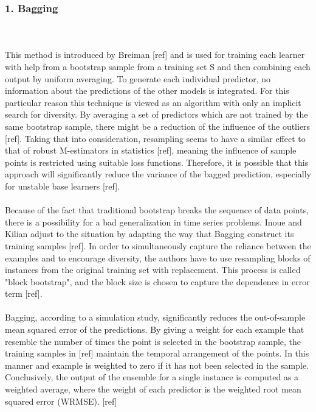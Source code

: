 \documentclass[runningheads,a4paper]{llncs}[2015/06/24]
\begin{document}
\subsubsection{1. Bagging}
\hspace{1cm}\\\\This method is introduced by Breiman [ref] and is used for training each learner with help from a bootstrap sample from a training set S and then combining each output by uniform averaging. To generate each individual predictor, no information about the predictions of the other models is integrated. For this particular reason this technique is viewed as an algorithm with only an implicit search for diversity. By averaging a set of predictors which are not trained by the same bootstrap sample, there might be a reduction of the influence of the outliers [ref]. Taking that into consideration, resampling seems to have a similar effect to that of robust M-estimators in statistics [ref],  meaning the influence of sample points is restricted using suitable loss functions. Therefore, it is possible that this approach will significantly reduce the variance of the bagged prediction, especially for unstable base learners [ref]. \\\\Because of the fact that traditional bootstrap breaks the sequence of data points, there is a possibility for a bad generalization in time series problems. Inoue and Kilian adjust to the situation by adapting the way that Bagging construct its training samples [ref]. In order to simultaneously capture the reliance between the examples and to encourage diversity,  the authors have to use resampling blocks of instances from the original training set with replacement. This process is called "block bootstrap", and the block size is chosen to capture the dependence in error term [ref].
\\\\Bagging, according to a simulation study,  significantly reduces the out-of-sample mean squared error of the predictions. By giving a weight for each example that resemble the number of times the point is selected in the bootstrap sample, the training samples in [ref] maintain the temporal arrangement of the points. In this manner and example is weighted to zero if it has not been selected in the sample. Conclusively, the output of the ensemble for a single instance is computed as a weighted average, where the weight of each predictor is the weighted root mean squared error (WRMSE). [ref]
\end{document}
